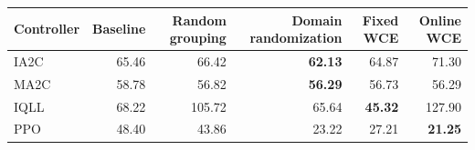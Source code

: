 \begin{tabular}{lrrrrr}
\hline
Controller & Baseline & Random grouping & Domain randomization & Fixed WCE & Online WCE \\
\hline
IA2C & 65.46 & 66.42 & \textbf{62.13} & 64.87 & 71.30 \\
MA2C & 58.78 & 56.82 & \textbf{56.29} & 56.73 & 56.29 \\
IQLL & 68.22 & 105.72 & 65.64 & \textbf{45.32} & 127.90 \\
PPO & 48.40 & 43.86 & 23.22 & 27.21 & \textbf{21.25} \\
\hline
\end{tabular}
